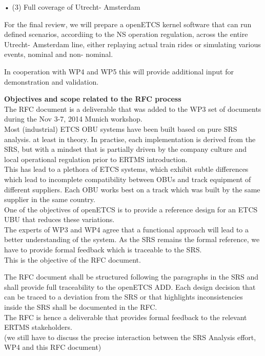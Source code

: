 •  (3) Full coverage of Utrecht- Amsterdam

For the final review, we will prepare a openETCS kernel software that can run defined scenarios, accordiing to the NS operation regulation, across the entire Utrecht- Amsterdam line, either replaying actual train rides or simulating various events, nominal and non- nominal.

In cooperation with WP4 and WP5 this will provide additional input for demonstration and validation.



\textbf{Objectives and scope related to the RFC process}\\


The RFC document is a deliverable that was added to the WP3 set of documents during the Nov 3-7, 2014 Munich workshop.\\

Most (industrial) ETCS OBU systems have been built based on pure SRS analysis. at least in theory. In practise, each implementation is derived from the SRS, but with a mindset that is partially driven by the company culture and local operational regulation prior to ERTMS introduction.\\
This has lead to a plethora of ETCS systems, which exhibit subtle differences which lead to incomplete compatibility between OBUs and track equipment of different suppliers. Each OBU works best on a track which was built by the same supplier in the same country.\\
One of the objectives of openETCS is to provide a reference design for an ETCS UBU that reduces these variations.\\
The experts of WP3 and WP4 agree that a functional approach will lead to a better understanding of the system. As the SRS remains the formal reference, we have to provide formal feedback which is traceable to the SRS.\\
This is the objective of the RFC document.

The RFC document shall be structured following the paragraphs in the SRS and shall provide full traceability to the openETCS ADD.
Each design decision that can be traced to a deviation from the SRS or that highlights inconsistencies inside the SRS shall be documented in the RFC.\\
The RFC is hence a deliverable that provides formal feedback to the relevant ERTMS stakeholders.\\

(we still have to discuss the precise interaction between the SRS Analysis effort, WP4 and this RFC document)

